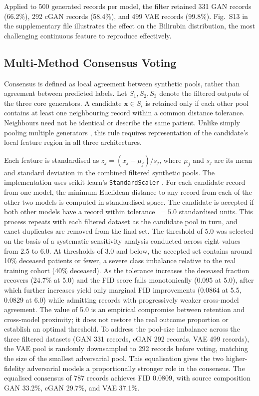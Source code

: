 \documentclass[journal]{IEEEtran}
\begin{document}
Applied to 500 generated records per model, the filter retained 331 GAN records (66.2\%), 292 cGAN records (58.4\%), and 499 VAE records (99.8\%). Fig.~S13 in the supplementary file illustrates the effect on the Bilirubin distribution, the most challenging continuous feature to reproduce effectively.

\subsection{Multi-Method Consensus Voting}

Consensus is defined as local agreement between synthetic pools, rather than agreement between predicted labels. Let $S_1,S_2,S_3$ denote the filtered outputs of the three core generators. A candidate $\mathbf{x}\in S_i$ is retained only if each other pool contains at least one neighbouring record within a common distance tolerance. Neighbours need not be identical or describe the same patient. Unlike simply pooling multiple generators \cite{jiang2023}, this rule requires representation of the candidate's local feature region in all three architectures.

Each feature is standardised as $z_j=(x_j-\mu_j)/s_j$, where $\mu_j$ and $s_j$ are its mean and standard deviation in the combined filtered synthetic pools. The implementation uses scikit-learn's \texttt{StandardScaler} \cite{pedregosa2011}. For each candidate record from one model, the minimum Euclidean distance to any record from each of the other two models is computed in standardised space. The candidate is accepted if both other models have a record within tolerance~$= 5.0$ standardised units. This process repeats with each filtered dataset as the candidate pool in turn, and exact duplicates are removed from the final set. The threshold of 5.0 was selected on the basis of a systematic sensitivity analysis conducted across eight values from 2.5 to 6.0. At thresholds of 3.0 and below, the accepted set contains around 10\% deceased patients or fewer, a severe class imbalance relative to the real training cohort (40\% deceased). As the tolerance increases the deceased fraction recovers (24.7\% at 5.0) and the FID score falls monotonically (0.095 at 5.0), after which further increases yield only marginal FID improvements (0.0864 at 5.5, 0.0829 at 6.0) while admitting records with progressively weaker cross-model agreement. The value of 5.0 is an empirical compromise between retention and cross-model proximity; it does not restore the real outcome proportion or establish an optimal threshold. To address the pool-size imbalance across the three filtered datasets (GAN 331 records, cGAN 292 records, VAE 499 records), the VAE pool is randomly downsampled to 292 records before voting, matching the size of the smallest adversarial pool. This equalisation gives the two higher-fidelity adversarial models a proportionally stronger role in the consensus. The equalised consensus of 787 records achieves FID 0.0809, with source composition GAN 33.2\%, cGAN 29.7\%, and VAE 37.1\%.
\end{document}
